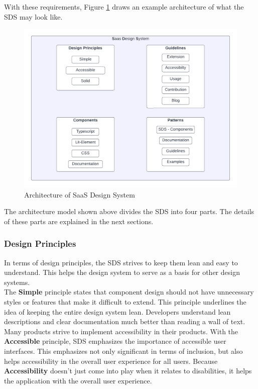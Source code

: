 With these requirements, Figure \ref{architecture_sds} draws an example architecture of what the SDS may look like.\\
\begin{figure}[htbp]
\centerline{\includegraphics[width=\linewidth]{images/architecture_sds.png}}
\caption{Architecture of SaaS Design System}
\label{architecture_sds}
\end{figure}

The architecture model shown above divides the \acl{SDS} into four parts. The details of these parts are explained in the next sections.
\subsubsection{Design Principles}
In terms of design principles, the \ac{SDS} strives to keep them lean and easy to understand. This helps the design system to serve as a basis for other design systems. \\

The \textbf{Simple} principle states that component design should not have unnecessary styles or features that make it difficult to extend. This principle underlines the idea of keeping the entire design system lean. Developers understand lean descriptions and clear documentation much better than reading a wall of text. \\

Many products strive to implement accessibility in their products. With the \textbf{Accessible} principle, \ac{SDS} emphasizes the importance of accessible user interfaces. This emphasizes not only significant in terms of inclusion, but also helps accessibility in the overall user experience for all users. Because \textbf{Accessibility} doesn't just come into play when it relates to disabilities, it helps the application with the overall user experience. \\

